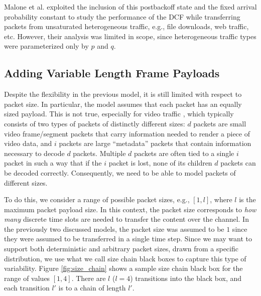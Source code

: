 \documentclass{llncs}
\begin{document}
Malone et al. \cite{dcf-nonsaturated} exploited the inclusion of this postbackoff state and the fixed arrival probability constant to study the performance of the DCF while transferring packets from unsaturated heterogeneous traffic, e.g., file downloads, web traffic, etc. However, their analysis was limited in scope, since heterogeneous traffic types were parameterized only by $p$ and $q$.

\subsection{Adding Variable Length Frame Payloads}
Despite the flexibility in the previous model, it is still limited with respect to packet size. In particular, the model assumes that each packet has an equally sized payload. This is not true, especially for video traffic \cite{badia2010markov}, which typically consists of two types of packets of distinctly different sizes: $d$ packets are small video frame/segment packets that carry information needed to render a piece of video data, and $i$ packets are large ``metadata'' packets that contain information necessary to decode $d$ packets. Multiple $d$ packets are often tied to a single $i$ packet in such a way that if the $i$ packet is lost, none of its children $d$ packets can be decoded correctly. Consequently, we need to be able to model packets of different sizes. 

To do this, we consider a range of possible packet sizes, e.g., $[1,l]$, where $l$ is the maximum packet payload size. In this context, the packet size corresponds to \emph{how many} discrete time slots are needed to transfer the content over the channel. In the previously two discussed models, the packet size was assumed to be $1$ since they were assumed to be transferred in a single time step. Since we may want to support both deterministic and arbitrary packet sizes, drawn from a specific distribution, we use what we call size chain black boxes to capture this type of variability. Figure \ref{fig:size_chain} shows a sample size chain black box for the range of values $[1,4]$. There are $l$ ($l = 4$) transitions into the black box, and each transition $l'$ is to a chain of length $l'$. 
\end{document}
